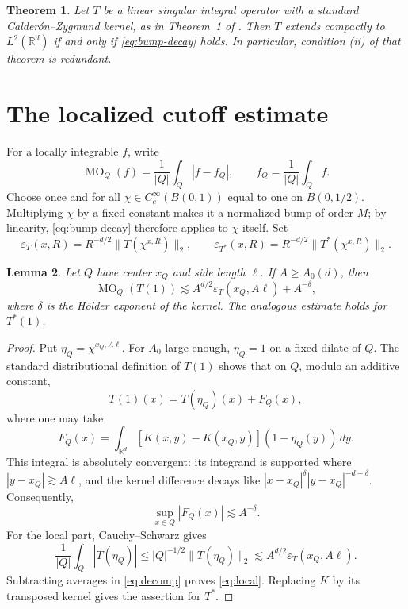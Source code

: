 \documentclass[11pt]{article}
\newtheorem{theorem}{Theorem}
\newtheorem{lemma}[theorem]{Lemma}
\newcommand{\R}{\mathbb R}
\newcommand{\MO}{\operatorname{MO}}
\begin{document}
\begin{theorem}\label{thm:main}
Let $T$ be a linear singular integral operator with a standard
Calder\'on--Zygmund kernel, as in Theorem~1 of \cite{BLOT}.  Then $T$
extends compactly to $L^2(\R^d)$ if and only if
\eqref{eq:bump-decay} holds.  In particular, condition (ii) of that theorem
is redundant.
\end{theorem}

\section{The localized cutoff estimate}

For a locally integrable $f$, write
\[
 \MO_Q(f)=\frac1{|Q|}\int_Q|f-f_Q|,
 \qquad f_Q=\frac1{|Q|}\int_Q f.
\]
Choose once and for all $\chi\in C_c^\infty(B(0,1))$ equal to one on
$B(0,1/2)$.  Multiplying $\chi$ by a fixed constant makes it a normalized
bump of order $M$; by linearity, \eqref{eq:bump-decay} therefore applies to
$\chi$ itself.  Set
\[
 \varepsilon_T(x,R)=R^{-d/2}\|T(\chi^{x,R})\|_2,
 \qquad
 \varepsilon_{T^*}(x,R)=R^{-d/2}\|T^*(\chi^{x,R})\|_2.
\]

\begin{lemma}\label{lem:local}
Let $Q$ have center $x_Q$ and side length $\ell$.  If $A\geq A_0(d)$,
then
\begin{equation}\label{eq:local}
 \MO_Q(T(1))
 \lesssim A^{d/2}\varepsilon_T(x_Q,A\ell)+A^{-\delta},
\end{equation}
where $\delta$ is the H\"older exponent of the kernel.  The analogous
estimate holds for $T^*(1)$.
\end{lemma}

\begin{proof}
Put $\eta_Q=\chi^{x_Q,A\ell}$.  For $A_0$ large enough, $\eta_Q=1$ on a
fixed dilate of $Q$.  The standard distributional definition of $T(1)$
shows that on $Q$, modulo an additive constant,
\begin{equation}\label{eq:decomp}
 T(1)(x)=T(\eta_Q)(x)+F_Q(x),
\end{equation}
where one may take
\[
 F_Q(x)=\int_{\R^d}
 [K(x,y)-K(x_Q,y)](1-\eta_Q(y))\,dy.
\]
This integral is absolutely convergent: its integrand is supported where
$|y-x_Q|\gtrsim A\ell$, and the kernel difference decays like
$|x-x_Q|^\delta|y-x_Q|^{-d-\delta}$.  Consequently,
\[
 \sup_{x\in Q}|F_Q(x)|\lesssim A^{-\delta}.
\]
For the local part, Cauchy--Schwarz gives
\[
 \frac1{|Q|}\int_Q|T(\eta_Q)|
 \leq |Q|^{-1/2}\|T(\eta_Q)\|_2
 \lesssim A^{d/2}\varepsilon_T(x_Q,A\ell).
\]
Subtracting averages in \eqref{eq:decomp} proves \eqref{eq:local}.  Replacing
$K$ by its transposed kernel gives the assertion for $T^*$.
\end{proof}
\end{document}
